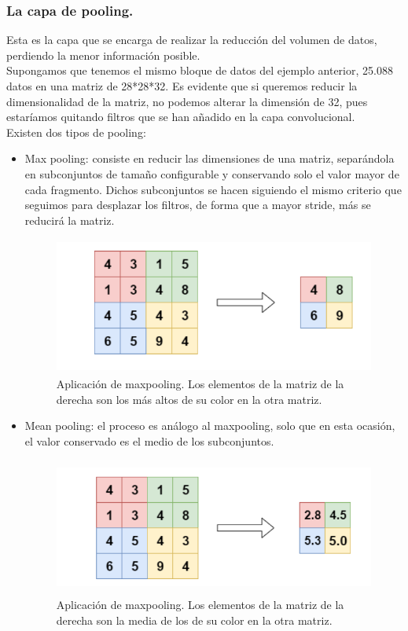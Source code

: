\documentclass[a4paper,11pt]{article}
\begin{document}
\subsubsection{La capa de pooling.}
Esta es la capa que se encarga de realizar la reducción del volumen de datos, perdiendo la menor información posible.\\ Supongamos que tenemos el mismo bloque de datos del ejemplo anterior, 25.088 datos en una matriz de 28*28*32. Es evidente que si queremos reducir la dimensionalidad de la matriz, no podemos alterar la dimensión de 32, pues estaríamos quitando filtros que se han añadido en la capa convolucional.\\

\noindent
Existen dos tipos de pooling:
\begin{itemize}
\item Max pooling: consiste en reducir las dimensiones de una matriz, separándola en subconjuntos de tamaño configurable y conservando solo el valor mayor de cada fragmento. Dichos subconjuntos se hacen siguiendo el mismo criterio que seguimos para desplazar los filtros, de forma que a mayor stride, más se reducirá la matriz.
\begin{figure}[H]
\centering
\includegraphics[width=11.0cm, height=4.5cm]{maxpool.png}
\caption{Aplicación de maxpooling. Los elementos de la matriz de la derecha son los más altos de su color en la otra matriz.}
\end{figure}
\item Mean pooling: el proceso es análogo al maxpooling, solo que en esta ocasión, el valor conservado es el medio de los subconjuntos.
\begin{figure}[H]
\centering
\includegraphics[width=11.0cm, height=4.5cm]{meanpool.png}
\caption{Aplicación de maxpooling. Los elementos de la matriz de la derecha son la media de los de su color en la otra matriz.}
\end{figure}
\end{itemize}
\end{document}
